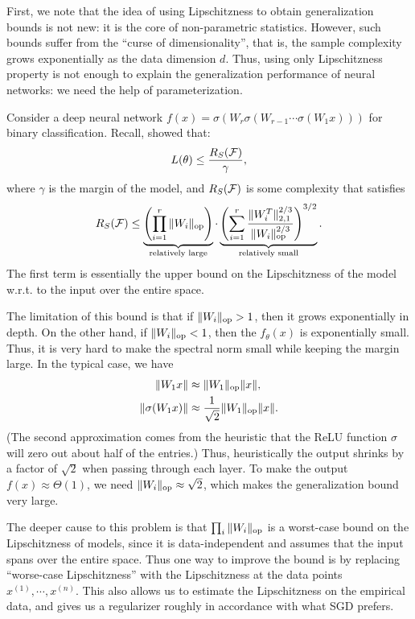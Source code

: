First, we note that the idea of using Lipschitzness to obtain generalization bounds is not new: it is the core of non-parametric statistics. However, such bounds suffer from the ``curse of dimensionality'', that is, the sample complexity grows exponentially as the data dimension $d$. Thus, using only Lipschitzness property is not enough to explain the generalization performance of neural networks: we need the help of parameterization. 

Consider a deep neural network $f(x) = \sigma(W_r\sigma(W_{r-1}\cdots \sigma(W_1x)))$ for binary classification. Recall, \cite{bartlett2017} showed that:
\begin{equation}
L(\theta) \leq \frac{R_S (\mathcal F) }{\gamma},
\end{equation}
where $\gamma$ is the margin of the model, and $R_S (\mathcal F)$ is some complexity that satisfies
\begin{equation}
R_S (\mathcal F) \leq \underbrace{\left(\prod_{i=1}^r\|W_i\|_{\textup{op}} \right)}_{\text{relatively large}} \cdot \underbrace{\left( \sum_{i=1}^r\frac{\|W_i^T\|^{2/3}_{2,1}}{\|W_i\|_{\textup{op}}^{2/3}}\right)^{3/2}}_{\text{relatively small}}.
\end{equation}
The first term is essentially the upper bound on the Lipschitzness of the model w.r.t. to the input over the entire space. 

The limitation of this bound is that if $\|W_i\|_{\textup{op}} >1$, then it grows exponentially in depth. On the other hand, if $\|W_i\|_{\textup{op}} < 1$, then the $f_\theta(x)$ is exponentially small. Thus, it is very hard to make the spectral norm small while keeping the margin large. In the typical case, we have
\begin{align}
    \|W_1x\| &\approx \|W_1\|_{\textup{op}}\|x\|, \\
    \|\sigma(W_1x)\| &\approx \frac{1}{\sqrt{2}}\|W_1\|_{\textup{op}}\|x\|.
\end{align}
(The second approximation comes from the heuristic that the ReLU function $\sigma$ will zero out about half of the entries.) Thus, heuristically the output shrinks by a factor of $\sqrt{2}$ when passing through each layer. To make the output $f(x)\approx \Theta(1)$, we need $\|W_i\|_{\textup{op}}\approx \sqrt{2}$, which makes the generalization bound very large. 

The deeper cause to this problem is that $\prod_i \|W_i\|_{\textup{op}}$ is a worst-case bound on the Lipschitzness of models, since it is data-independent and assumes that the input spans over the entire space. Thus one way to improve the bound is by replacing ``worse-case Lipschitzness'' with the Lipschitzness at the data points $x^{(1)}, \cdots, x^{(n)}$. This also allows us to estimate the Lipschitzness on the empirical data, and gives us a regularizer roughly in accordance with what SGD prefers.

